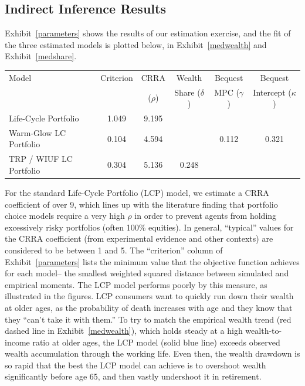 \documentclass[12pt,letterpaper, fleqn]{article}
\newcommand{\CRRA}{\rho}
\begin{document}
\subsection{Indirect Inference Results}

Exhibit~\ref{parameters} shows the results of our estimation exercise, and the fit of the three estimated models is plotted below, in Exhibit~\ref{medwealth} and Exhibit~\ref{medshare}.

\begin{exhibit}[t!]
\centering
\caption{Estimated Parameter Values}\label{parameters}
\begin{tabular}{lccccc}
\toprule
Model & Criterion & CRRA & Wealth & Bequest  & Bequest \\
 & & ($\CRRA$) & Share ($\delta$) & MPC ($\gamma$) & Intercept ($\kappa$) \\
\midrule
\vspace{0.25cm} Life-Cycle Portfolio & 1.049 & 9.195 &  &  &  \\
\vspace{0.25cm} Warm-Glow LC Portfolio & 0.104 & 4.594 &  & 0.112 & 0.321 \\
TRP / WIUF LC Portfolio & 0.304 & 5.136 & 0.248 &  &  \\
\bottomrule
\end{tabular}
\end{exhibit}

For the standard Life-Cycle Portfolio (LCP) model, we estimate a CRRA coefficient of over 9, which lines up with the literature finding that portfolio choice models require a very high $\CRRA$ in order to prevent agents from holding excessively risky portfolios (often 100\% equities).
In general, ``typical'' values for the CRRA coefficient (from experimental evidence and other contexts) are considered to be between 1 and 5.
The ``criterion'' column of Exhibit~\ref{parameters} lists the minimum value that the objective function achieves for each model-- the smallest weighted squared distance between simulated and empirical moments.
The LCP model performs poorly by this measure, as illustrated in the figures.
LCP consumers want to quickly run down their wealth at older ages, as the probability of death increases with age and they know that they ``can't take it with them.''
To try to match the empirical wealth trend (red dashed line in Exhibit~\ref{medwealth}), which holds steady at a high wealth-to-income ratio at older ages, the LCP model (solid blue line) exceeds observed wealth accumulation through the working life.
Even then, the wealth drawdown is so rapid that the best the LCP model can achieve is to overshoot wealth significantly before age 65, and then vastly undershoot it in retirement.
\end{document}
